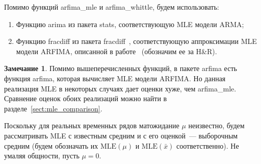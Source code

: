 \documentclass[specialist,
substylefile = spbu_report.rtx,
subf,href,colorlinks=true, 12pt]{disser}
\theoremstyle{definition}
\newtheorem{remark}{Замечание}[chapter]
\begin{document}
Помимо функций \textsf{arfima\_mle} и \textsf{arfima\_whittle}, будем использовать:
\begin{enumerate}
	\item Функцию \textsf{arima} из пакета \textsf{stats}, соответствующую MLE модели ARMA;
	\item Функцию \textsf{fracdiff} из пакета \textsf{fracdiff}~\cite{Maechler1999}, соответствующую аппроксимации MLE модели ARFIMA, описанной в работе~\cite{Haslett1989} (обозначим ее за H\&R).
\end{enumerate}
\begin{remark}
	Помимо вышеперечисленных функций, в пакете \textsf{arfima} есть функция \textsf{arfima}, которая вычисляет MLE модели ARFIMA. Но данная реализация MLE в некоторых случаях дает оценки хуже, чем \textsf{arfima\_mle}. Сравнение оценок обоих реализаций можно найти в разделе~\ref{sect:mle_comparison}.
\end{remark}
Поскольку для реальных временных рядов матожидание $\mu$ неизвестно, будем рассматривать MLE с известным средним и с его оценкой~--- выборочным средним (будем обозначать их $\mathrm{MLE}(\mu)$ и $\mathrm{MLE}(\bar x)$ соответственно). Не умаляя общности, пусть $\mu=0$.
\end{document}
